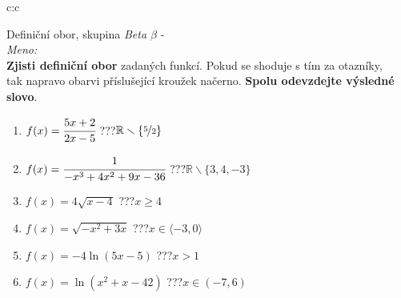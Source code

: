 \documentclass[10pt]{report}
\begin{document}
\newpage
\thispagestyle{empty}
\begin{tabular}{c:c}
\begin{minipage}[c][99mm][t]{0.49\linewidth}
\begin{center}
\vspace{7mm}
{\huge Definiční obor, skupina \textit{Beta $\beta$} -}\\[4.5mm]
\textit{Meno:}\phantom{xxxxxxxxxxxxxxxxxxxxxxxxxxxxxxxxxxxxxxxxxxxxxxxxxxxxxxxxxxxxxxxxx}\\[3.5mm]
\textbf{Zjisti definiční obor} zadaných funkcí. Pokud se shoduje s tím za otazníky,\\tak napravo obarvi příslušející kroužek načerno. \textbf{Spolu odevzdejte výsledné slovo}.\\[3mm]
\begin{minipage}{0.77\linewidth}
\begin{center}
\begin{varwidth}{\textwidth}
\begin{enumerate}
\normalsize
\item $f(x)=\cfrac{5x+2}{2x-5}$\quad \dotfill\; ???\;\dotfill \quad $\mathbb{R}\smallsetminus\{\nicefrac{5}{2}\}$
\item $f(x)=\cfrac{1}{-x^3+4x^2+9x-36}$\quad \dotfill\; ???\;\dotfill \quad $\mathbb{R}\smallsetminus\{3,4,-3\}$
\item $f(x)=4\sqrt{x-4}$\quad \dotfill\; ???\;\dotfill \quad $x\geq4$
\item $f(x)=\sqrt{-x^2+3x}$\quad \dotfill\; ???\;\dotfill \quad $x\in\langle-3 , 0\rangle$
\item $f(x)=-4\ln{(5x-5)}$\quad \dotfill\; ???\;\dotfill \quad $x>1$
\item $f(x)=\ln{(x^2+x-42)}$\quad \dotfill\; ???\;\dotfill \quad $x\in(-7 , 6)$
\end{enumerate}
\end{varwidth}
\end{center}
\end{minipage}
\begin{minipage}{0.20\linewidth}

\end{minipage}
\end{center}
\end{minipage}
\end{tabular}
\end{document}
